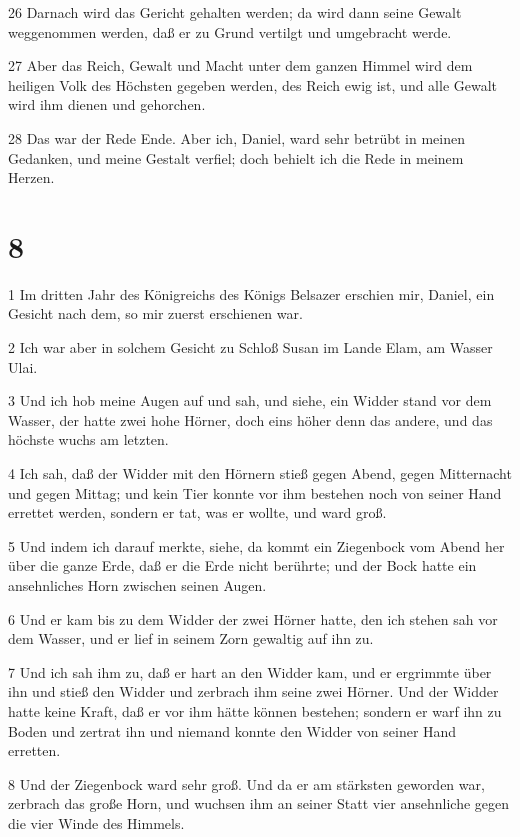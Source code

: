 \par 26 Darnach wird das Gericht gehalten werden; da wird dann seine Gewalt weggenommen werden, daß er zu Grund vertilgt und umgebracht werde.
\par 27 Aber das Reich, Gewalt und Macht unter dem ganzen Himmel wird dem heiligen Volk des Höchsten gegeben werden, des Reich ewig ist, und alle Gewalt wird ihm dienen und gehorchen.
\par 28 Das war der Rede Ende. Aber ich, Daniel, ward sehr betrübt in meinen Gedanken, und meine Gestalt verfiel; doch behielt ich die Rede in meinem Herzen.

\chapter{8}

\par 1 Im dritten Jahr des Königreichs des Königs Belsazer erschien mir, Daniel, ein Gesicht nach dem, so mir zuerst erschienen war.
\par 2 Ich war aber in solchem Gesicht zu Schloß Susan im Lande Elam, am Wasser Ulai.
\par 3 Und ich hob meine Augen auf und sah, und siehe, ein Widder stand vor dem Wasser, der hatte zwei hohe Hörner, doch eins höher denn das andere, und das höchste wuchs am letzten.
\par 4 Ich sah, daß der Widder mit den Hörnern stieß gegen Abend, gegen Mitternacht und gegen Mittag; und kein Tier konnte vor ihm bestehen noch von seiner Hand errettet werden, sondern er tat, was er wollte, und ward groß.
\par 5 Und indem ich darauf merkte, siehe, da kommt ein Ziegenbock vom Abend her über die ganze Erde, daß er die Erde nicht berührte; und der Bock hatte ein ansehnliches Horn zwischen seinen Augen.
\par 6 Und er kam bis zu dem Widder der zwei Hörner hatte, den ich stehen sah vor dem Wasser, und er lief in seinem Zorn gewaltig auf ihn zu.
\par 7 Und ich sah ihm zu, daß er hart an den Widder kam, und er ergrimmte über ihn und stieß den Widder und zerbrach ihm seine zwei Hörner. Und der Widder hatte keine Kraft, daß er vor ihm hätte können bestehen; sondern er warf ihn zu Boden und zertrat ihn und niemand konnte den Widder von seiner Hand erretten.
\par 8 Und der Ziegenbock ward sehr groß. Und da er am stärksten geworden war, zerbrach das große Horn, und wuchsen ihm an seiner Statt vier ansehnliche gegen die vier Winde des Himmels.
